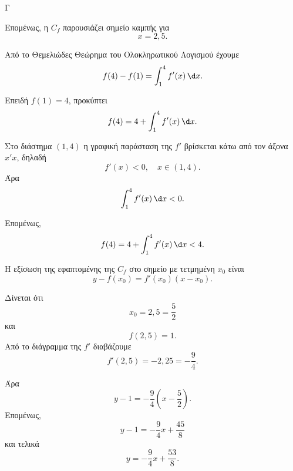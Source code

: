 \begin{thema}{Γ}
\begin{erwthma}
Επομένως, η $C_f$ παρουσιάζει σημείο καμπής για
\[
x=2{,}5.
\]

\item Από το Θεμελιώδες Θεώρημα του Ολοκληρωτικού Λογισμού έχουμε
\[
f(4)-f(1)=\int_1^4 f'(x)\,\d x.
\]

Επειδή $f(1)=4$, προκύπτει
\[
f(4)=4+\int_1^4 f'(x)\,\d x.
\]

Στο διάστημα $(1,4)$ η γραφική παράσταση της $f'$ βρίσκεται κάτω από τον άξονα $x'x$, δηλαδή
\[
f'(x)<0,\quad x\in(1,4).
\]
Άρα
\[
\int_1^4 f'(x)\,\d x<0.
\]

Επομένως,
\[
f(4)=4+\int_1^4 f'(x)\,\d x<4.
\]

\item Η εξίσωση της εφαπτομένης της $C_f$ στο σημείο με τετμημένη $x_0$ είναι
\[
y-f(x_0)=f'(x_0)(x-x_0).
\]

Δίνεται ότι
\[
x_0=2{,}5=\frac{5}{2}
\]
και
\[
f(2{,}5)=1.
\]
Από το διάγραμμα της $f'$ διαβάζουμε
\[
f'(2{,}5)=-2{,}25=-\frac{9}{4}.
\]

Άρα
\[
y-1=-\frac{9}{4}\left(x-\frac{5}{2}\right).
\]
Επομένως,
\[
y-1=-\frac{9}{4}x+\frac{45}{8}
\]
και τελικά
\[
y=-\frac{9}{4}x+\frac{53}{8}.
\]
\end{erwthma}
\end{thema}



